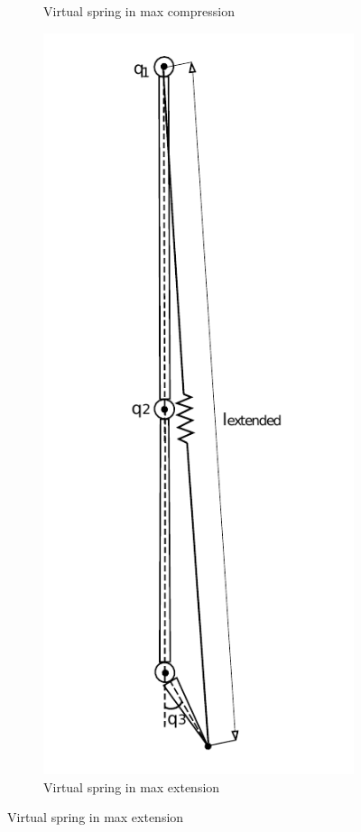 \begin{figure}[ht!]
\begin{subfigure}[b]{0.25\textwidth}
        \caption{Virtual spring in max compression}
        \label{fig:virtual_spring2}
    \end{subfigure}
    \begin{subfigure}[b]{0.25\textwidth}
        \includegraphics[width=\textwidth]{figures//spring_model_max_extended.pdf}
        \caption{Virtual spring in max extension}
        \label{fig:virtual_spring3}
    \end{subfigure}
\end{figure}  


